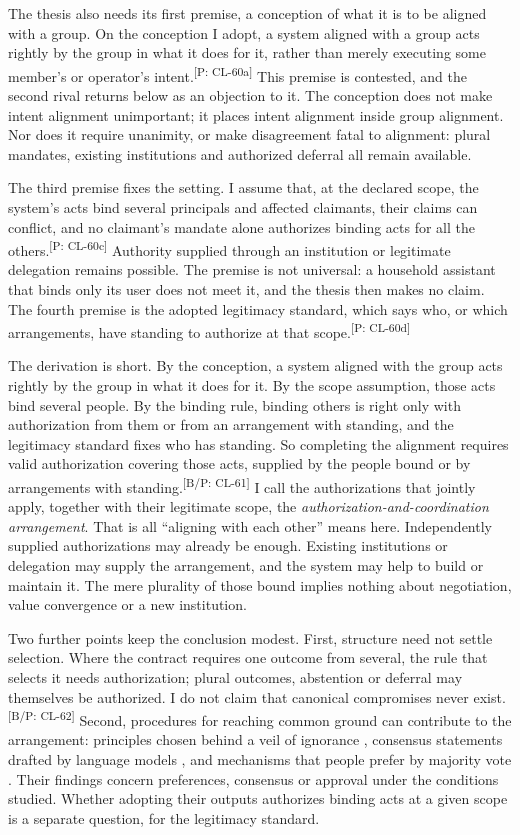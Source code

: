 \documentclass[pdflatex,sn-basic]{sn-jnl}%
\newcommand{\slot}[1]{}%
\newcommand{\claim}[2]{\ifannotated\textsuperscript{\textcolor{blue!60!black}{\tiny[#1: #2]}}\fi}
\newcommand{\enquote}[1]{``#1''}
\begin{document}
The thesis also needs its first premise, a conception of what it is to be aligned with a group. On the conception I adopt, a system aligned with a group acts rightly by the group in what it does for it, rather than merely executing some member's or operator's intent.\claim{P}{CL-60a} This premise is contested, and the second rival returns below as an objection to it. The conception does not make intent alignment unimportant; it places intent alignment inside group alignment. Nor does it require unanimity, or make disagreement fatal to alignment: plural mandates, existing institutions and authorized deferral all remain available.

\slot{3.2}
The third premise fixes the setting. I assume that, at the declared scope, the system's acts bind several principals and affected claimants, their claims can conflict, and no claimant's mandate alone authorizes binding acts for all the others.\claim{P}{CL-60c} Authority supplied through an institution or legitimate delegation remains possible. The premise is not universal: a household assistant that binds only its user does not meet it, and the thesis then makes no claim. The fourth premise is the adopted legitimacy standard, which says who, or which arrangements, have standing to authorize at that scope.\claim{P}{CL-60d}

The derivation is short. By the conception, a system aligned with the group acts rightly by the group in what it does for it. By the scope assumption, those acts bind several people. By the binding rule, binding others is right only with authorization from them or from an arrangement with standing, and the legitimacy standard fixes who has standing. So completing the alignment requires valid authorization covering those acts, supplied by the people bound or by arrangements with standing.\claim{B/P}{CL-61} I call the authorizations that jointly apply, together with their legitimate scope, the \emph{authorization-and-coordination arrangement}. That is all \enquote{aligning with each other} means here. Independently supplied authorizations may already be enough. Existing institutions or delegation may supply the arrangement, and the system may help to build or maintain it. The mere plurality of those bound implies nothing about negotiation, value convergence or a new institution.

Two further points keep the conclusion modest. First, structure need not settle selection. Where the contract requires one outcome from several, the rule that selects it needs authorization; plural outcomes, abstention or deferral may themselves be authorized. I do not claim that canonical compromises never exist.\claim{B/P}{CL-62} Second, procedures for reaching common ground can contribute to the arrangement: principles chosen behind a veil of ignorance \citep{weidinger2023}, consensus statements drafted by language models \citep{bakker2022,tessler2024}, and mechanisms that people prefer by majority vote \citep{koster2022}. Their findings concern preferences, consensus or approval under the conditions studied. Whether adopting their outputs authorizes binding acts at a given scope is a separate question, for the legitimacy standard.
\end{document}

